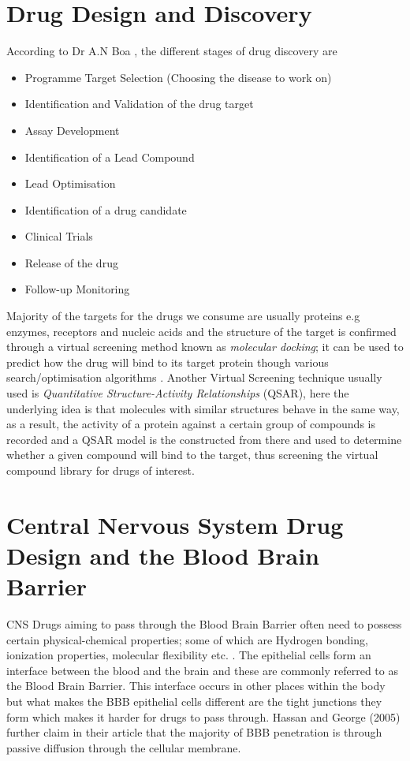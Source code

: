 \documentclass[a4paper,12pt]{report}
\begin{document}
	\section{Drug Design and Discovery}
	According to Dr A.N Boa \cite{hull2016}, the different stages of drug discovery are
		\begin{itemize}
			\item Programme Target Selection (Choosing the disease to work on)
			\item Identification and Validation of the drug target
			\item Assay Development
			\item Identification of a Lead Compound
			\item Lead Optimisation
			\item Identification of a drug candidate 
			\item Clinical Trials 
			\item Release of the drug 
			\item Follow-up Monitoring
		\end{itemize}
	Majority of the targets for the drugs we consume are usually proteins e.g enzymes, receptors and nucleic acids and the structure of the target is confirmed through a virtual screening method known as \textit{molecular docking}; it can be used to predict how the drug will bind to its target protein though various search/optimisation algorithms \cite{Jurgen2004}.
	Another Virtual Screening technique usually used is \textit{Quantitative Structure-Activity Relationships} (QSAR), here the underlying idea is that molecules with similar structures behave in the same way, as a result, the activity of a protein against a certain group of compounds is recorded and a QSAR model is the constructed from there and used to determine whether a given compound will bind to the target, thus screening the virtual compound library for drugs of interest.
	
	\section[CNS Drug Design and the Blood Brain Barrier]{Central Nervous System Drug Design and the Blood Brain Barrier}
	CNS Drugs aiming to pass through the Blood Brain Barrier often need to possess certain physical-chemical properties; some of which are Hydrogen bonding, ionization properties, molecular flexibility etc. \cite{Hassanetal2005}. The epithelial cells form an interface between the blood and the brain and these are commonly referred to as the Blood Brain Barrier. This interface occurs in other places within the body but what makes the BBB epithelial cells different are the tight junctions they form which makes it harder for drugs to pass through. Hassan and George (2005) further claim in their article that the majority of BBB penetration is through passive diffusion through the cellular membrane.
\end{document}
